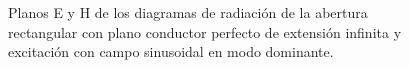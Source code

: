\begin{figure} [H]
\centering 
{}
\hspace{5mm}
\caption{Planos E y H de los diagramas de radiación de la abertura rectangular con plano conductor perfecto de extensión infinita y excitación con campo sinusoidal en modo dominante.}
\label{grup_fig_estudio:2}
\end{figure}
